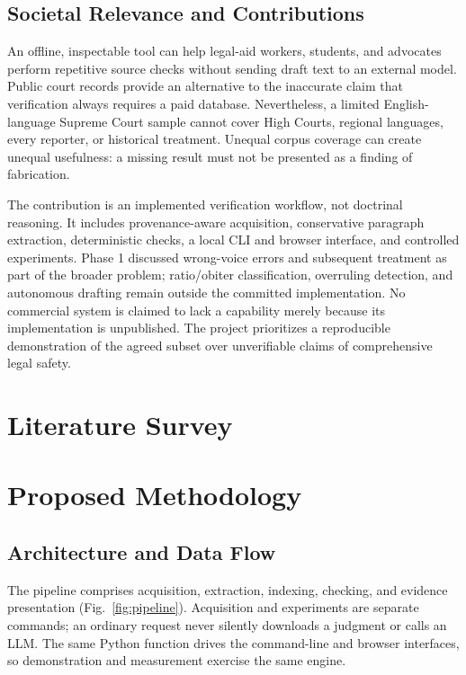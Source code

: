 \documentclass[conference]{IEEEtran}
\begin{document}
\subsection{Societal Relevance and Contributions}
An offline, inspectable tool can help legal-aid workers, students, and advocates perform repetitive source checks without sending draft text to an external model. Public court records provide an alternative to the inaccurate claim that verification always requires a paid database. Nevertheless, a limited English-language Supreme Court sample cannot cover High Courts, regional languages, every reporter, or historical treatment. Unequal corpus coverage can create unequal usefulness: a missing result must not be presented as a finding of fabrication.

The contribution is an implemented verification workflow, not doctrinal reasoning. It includes provenance-aware acquisition, conservative paragraph extraction, deterministic checks, a local CLI and browser interface, and controlled experiments. Phase 1 discussed wrong-voice errors and subsequent treatment as part of the broader problem; ratio/obiter classification, overruling detection, and autonomous drafting remain outside the committed implementation. No commercial system is claimed to lack a capability merely because its implementation is unpublished. The project prioritizes a reproducible demonstration of the agreed subset over unverifiable claims of comprehensive legal safety.

\section{Literature Survey}


\section{Proposed Methodology}
\subsection{Architecture and Data Flow}
The pipeline comprises acquisition, extraction, indexing, checking, and evidence presentation (Fig.~\ref{fig:pipeline}). Acquisition and experiments are separate commands; an ordinary request never silently downloads a judgment or calls an LLM. The same Python function drives the command-line and browser interfaces, so demonstration and measurement exercise the same engine.
\end{document}
